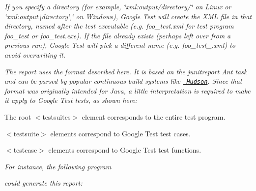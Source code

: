 {\itshape If you specify a directory (for example, {\ttfamily \char`\"{}xml\+:output/directory/\char`\"{}} on Linux or {\ttfamily \char`\"{}xml\+:output\textbackslash{}directory\textbackslash{}\char`\"{}} on Windows), Google Test will create the X\+ML file in that directory, named after the test executable (e.\+g. {\ttfamily foo\+\_\+test.\+xml} for test program {\ttfamily foo\+\_\+test} or {\ttfamily foo\+\_\+test.\+exe}). If the file already exists (perhaps left over from a previous run), Google Test will pick a different name (e.\+g. {\ttfamily foo\+\_\+test\+\_.\+xml}) to avoid overwriting it.}

{\itshape The report uses the format described here. It is based on the {\ttfamily junitreport} Ant task and can be parsed by popular continuous build systems like \href{https://hudson.dev.java.net/}\texttt{ Hudson}. Since that format was originally intended for Java, a little interpretation is required to make it apply to Google Test tests, as shown here\+:}

{\itshape 
\begin{DoxyCode}{0}
\end{DoxyCode}
}

{\itshape 
\begin{DoxyItemize}
\item The root {\ttfamily $<$testsuites$>$} element corresponds to the entire test program.
\item {\ttfamily $<$testsuite$>$} elements correspond to Google Test test cases.
\item {\ttfamily $<$testcase$>$} elements correspond to Google Test test functions.
\end{DoxyItemize}}

{\itshape For instance, the following program}

{\itshape 
\begin{DoxyCode}{0}
\end{DoxyCode}
}

{\itshape could generate this report\+:}

